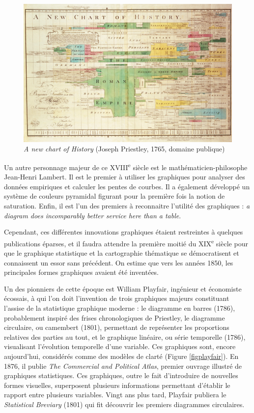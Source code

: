 \documentclass[]{article}
\begin{document}
\begin{figure}
\hypertarget{fig:priestley}{%
\centering
\includegraphics{img/chap1/priestley.jpg}
\caption{\emph{A new chart of History} (Joseph Priestley, 1765, domaine publique)}\label{fig:priestley}
}
\end{figure}

Un autre personnage majeur de ce XVIII\textsuperscript{e} siècle est le mathématicien-philosophe Jean-Henri Lambert. Il est le premier à utiliser les graphiques pour analyser des données empiriques et calculer les pentes de courbes. Il a également développé un système de couleurs pyramidal figurant pour la première fois la notion de saturation. Enfin, il est l'un des premiers à reconnaitre l'utilité des graphiques : \emph{a diagram does incomparably better service here than a table}.

Cependant, ces différentes innovations graphiques étaient restreintes à quelques publications éparses, et il faudra attendre la première moitié du XIX\textsuperscript{e} siècle pour que le graphique statistique et la cartographie thématique se démocratisent et connaissent un essor sans précédent. On estime que vers les années 1850, les principales formes graphiques avaient été inventées.

Un des pionniers de cette époque est William Playfair, ingénieur et économiste écossais, à qui l'on doit l'invention de trois graphiques majeurs constituant l'assise de la statistique graphique moderne : le diagramme en barres (1786), probablement inspiré des frises chronologiques de Priestley, le diagramme circulaire, ou camembert (1801), permettant de représenter les proportions relatives des parties au tout, et le graphique linéaire, ou série temporelle (1786), visualisant l'évolution temporelle d'une variable. Ces graphiques sont, encore aujourd'hui, considérés comme des modèles de clarté (Figure \ref{figplayfair}). En 1876, il publie \emph{The Commercial and Political Atlas}, premier ouvrage illustré de graphiques statistiques. Ces graphiques, outre le fait d'introduire de nouvelles formes visuelles, superposent plusieurs informations permettant d'établir le rapport entre plusieurs variables. Vingt ans plus tard, Playfair publiera le \emph{Statistical Breviary} (1801) qui fit découvrir les premiers diagrammes circulaires.
\end{document}
